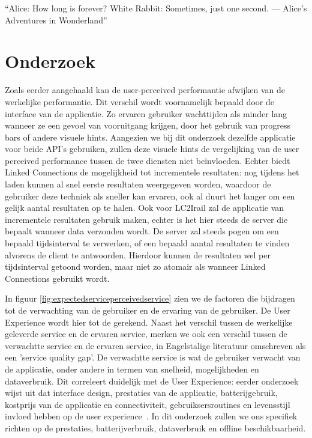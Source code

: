 \begin{savequote}[0.55\linewidth]
	``Alice: How long is forever? White Rabbit: Sometimes, just one second. —  Alice's Adventures in Wonderland''
\end{savequote}

\chapter{Onderzoek}

\label{chap:onderzoek}
Zoals eerder aangehaald kan de user-perceived performantie afwijken van de werkelijke performantie. Dit verschil wordt voornamelijk bepaald door de interface van de applicatie. Zo ervaren gebruiker wachttijden als minder lang wanneer ze een gevoel van vooruitgang krijgen, door het gebruik van progress bars of andere visuele hints. Aangezien we bij dit onderzoek dezelfde applicatie voor beide API's gebruiken, zullen deze visuele hints de vergelijking van de user perceived performance tussen de twee diensten niet beïnvloeden. Echter biedt Linked Connections de mogelijkheid tot incrementele resultaten: nog tijdens het laden kunnen al snel eerste resultaten weergegeven worden, waardoor de gebruiker deze techniek als sneller kan ervaren, ook al duurt het langer om een gelijk aantal resultaten op te halen. Ook voor LC2Irail zal de applicatie van incrementele resultaten gebruik maken, echter is het hier steeds de server die bepaalt wanneer data verzonden wordt. De server zal steeds pogen om een bepaald tijdsinterval te verwerken, of een bepaald aantal resultaten te vinden alvorens de client te antwoorden. Hierdoor kunnen de resultaten wel per tijdsinterval getoond worden, maar niet zo atomair als wanneer Linked Connections gebruikt wordt.

In figuur \ref{fig:expectedserviceperceivedservice} zien we de factoren die bijdragen tot de verwachting van de gebruiker en de ervaring van de gebruiker. De User Experience wordt hier tot de  gerekend. Naast het verschil tussen de werkelijke geleverde service en de ervaren service, merken we ook een verschil tussen de verwachtte service en de ervaren service, in Engelstalige literatuur omschreven als een 'service quality gap'. De verwachtte service is wat de gebruiker verwacht van de applicatie, onder andere in termen van snelheid, mogelijkheden en dataverbruik. Dit correleert duidelijk met de User Experience: eerder onderzoek wijst uit dat interface design, prestaties van de applicatie, batterijgebruik, kostprijs van de applicatie en connectiviteit, gebruiksersroutines en levensstijl invloed hebben op de user experience~\citep{ickin12}. In dit onderzoek zullen we ons specifiek richten op de prestaties, batterijverbruik, dataverbruik en  offline beschikbaarheid.

